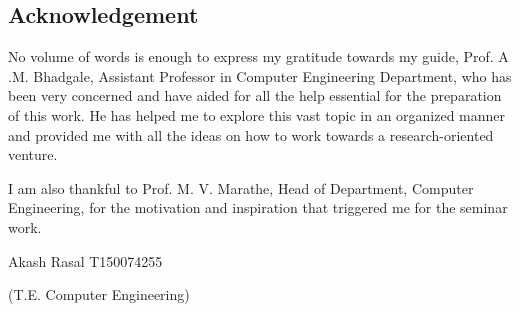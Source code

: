 \documentclass[12pt,a4paper]{article}
\begin{document}
\newpage
\cleardoublepage
\thispagestyle{empty}

\begin{center}
\section{Acknowledgement}
\end{center}
\noindent
\par No volume of words is enough to express my gratitude towards my guide, Prof. A .M. Bhadgale, Assistant Professor in Computer Engineering Department, who has been very concerned and have aided for all the help essential for the preparation of this work. He has helped me to explore this vast topic in an organized manner and provided me with all the ideas on how to work towards a research-oriented venture.
\par  I am also thankful to Prof. M. V. Marathe, Head of Department, Computer Engineering, for the motivation and inspiration that triggered me for the seminar work.

\par
Akash Rasal   T150074255\par
(T.E. Computer Engineering)


\newpage
\end{document}
